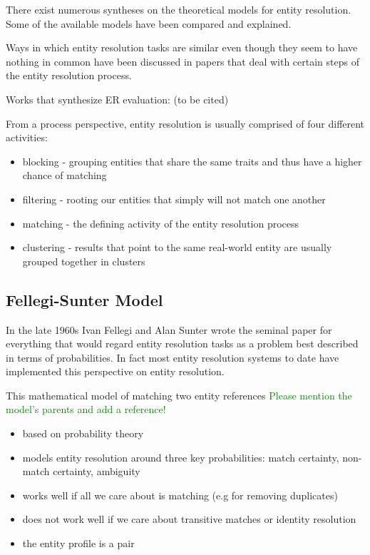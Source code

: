 \documentclass[11pt]{article}
\begin{document}
    There exist numerous syntheses on the theoretical models for entity
    resolution\cite{fs1969,Ben2009Swoosh,Tal11}.
    Some of the available models have been compared and
    explained\cite{Tal11,tal2013}.

    Ways in which entity resolution tasks are similar even though they seem
    to have nothing in common have been discussed in papers that deal with
    certain steps of the entity resolution process\cite{Pap19,Chen09}.

    Works that synthesize ER evaluation: (to be cited)

    From a process perspective, entity resolution is usually comprised of four
    different activities\cite{Pap19,Tal11}:
    \begin{itemize}
        \item blocking - grouping entities that share the same traits and thus
        have a higher chance of matching
        \item filtering - rooting our entities that simply will not match one
        another
        \item matching - the defining activity of the entity resolution process
        \item clustering - results that point to the same real-world entity are
        usually grouped together in clusters
    \end{itemize}

    \subsection[fsm]{Fellegi-Sunter Model}\label{subsec:fsm}
    In the late 1960s Ivan Fellegi and Alan Sunter wrote the seminal
    paper\cite{fs1969} for everything that would regard entity resolution tasks
    as a problem best described in terms of probabilities.
    In fact most entity resolution systems to date have implemented this
    perspective on entity resolution.

    This mathematical model of matching two entity references 
    \textcolor{green}{Please mention the model's parents and add a reference!}
    \begin{itemize}
        \item based on probability theory
        \item models entity resolution around three key probabilities: match certainty, non-match certainty, ambiguity
        \item works well if all we care about is matching (e.g for removing duplicates)
        \item does not work well if we care about transitive matches or identity resolution
        \item the entity profile is a pair
    \end{itemize}
\end{document}
